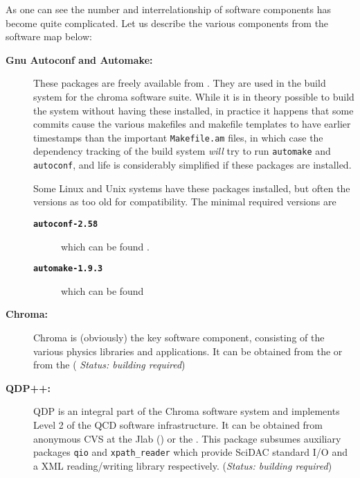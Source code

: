 \documentclass{article}
\begin{document}
As one can see the number and interrelationship of software components has
become quite complicated. Let us describe the various components from the 
software map below:
\begin{description}
\item[{\bf Gnu Autoconf and Automake: \ }]
These packages are freely available from . They are used in the build system for the 
chroma software suite. While it is in theory possible to build the system 
without having these installed, in practice it happens that some commits cause
the various makefiles and makefile templates to have earlier timestamps than 
the important {\tt Makefile.am} files, in which case the dependency tracking
of the build system {\em will} try to run {\tt automake} and {\tt autoconf},
and life is considerably simplified if these packages are installed. 


Some Linux and Unix systems have these packages installed, but often the versions as too old for compatibility. The minimal required versions are 
\begin{description}
   \item[{\bf \tt autoconf-2.58}] which can be found .
   \item[{\bf \tt automake-1.9.3}] which can be found 
\end{description}
\item[{\bf Chroma: \ } ] Chroma is (obviously) the key software
component, consisting of the various physics libraries and
applications. It can be obtained from the  or from the
 ({\em
Status: building required})

\item[{\bf QDP++: \ } ]
QDP is an integral part of the Chroma software system and implements Level 2 of the  QCD software infrastructure. It can be obtained from anonymous CVS at the Jlab () or the . This package subsumes auxiliary packages {\tt qio} and {\tt xpath\_reader} which provide SciDAC standard I/O and a XML reading/writing library respectively. ({\em Status: building required})


\end{description}
\end{document}
